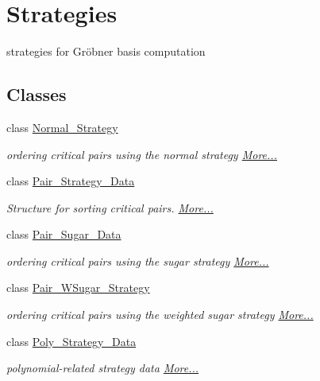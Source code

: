 \hypertarget{group__strategygroup}{}\section{Strategies}
\label{group__strategygroup}


strategies for Gr\"{o}bner basis computation  


\subsection*{Classes}
\begin{DoxyCompactItemize}
\item 
class \hyperlink{group__strategygroup_class_normal___strategy}{Normal\+\_\+\+Strategy}
\begin{DoxyCompactList}\small\item\em ordering critical pairs using the normal strategy  \hyperlink{group__strategygroup_class_normal___strategy}{More...}\end{DoxyCompactList}\item 
class \hyperlink{group__strategygroup_class_pair___strategy___data}{Pair\+\_\+\+Strategy\+\_\+\+Data}
\begin{DoxyCompactList}\small\item\em Structure for sorting critical pairs.  \hyperlink{group__strategygroup_class_pair___strategy___data}{More...}\end{DoxyCompactList}\item 
class \hyperlink{group__strategygroup_class_pair___sugar___data}{Pair\+\_\+\+Sugar\+\_\+\+Data}
\begin{DoxyCompactList}\small\item\em ordering critical pairs using the sugar strategy  \hyperlink{group__strategygroup_class_pair___sugar___data}{More...}\end{DoxyCompactList}\item 
class \hyperlink{group__strategygroup_class_pair___w_sugar___strategy}{Pair\+\_\+\+W\+Sugar\+\_\+\+Strategy}
\begin{DoxyCompactList}\small\item\em ordering critical pairs using the weighted sugar strategy  \hyperlink{group__strategygroup_class_pair___w_sugar___strategy}{More...}\end{DoxyCompactList}\item 
class \hyperlink{group__strategygroup_class_poly___strategy___data}{Poly\+\_\+\+Strategy\+\_\+\+Data}
\begin{DoxyCompactList}\small\item\em polynomial-\/related strategy data  \hyperlink{group__strategygroup_class_poly___strategy___data}{More...}\end{DoxyCompactList}\item 

\end{DoxyCompactItemize}
